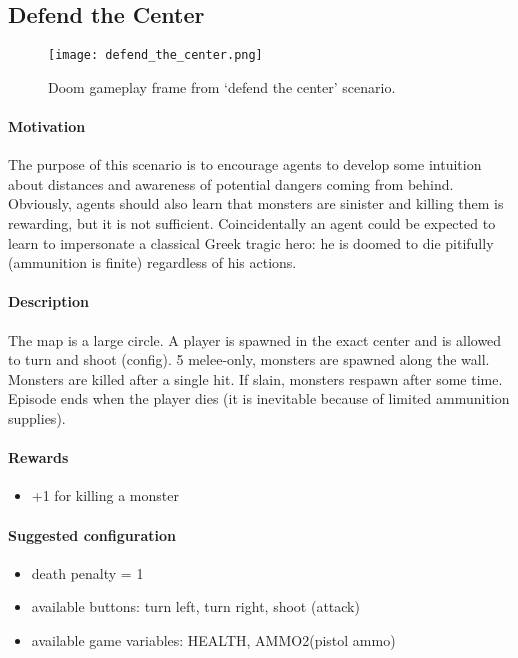 	\subsection{Defend the Center}\label{subsec:defend_the_center}
		\begin{figure}
			\centering
			\texttt{[image: defend\_the\_center.png]}
			\caption{Doom gameplay frame from `defend the center' scenario.}\label{fig:defend_the_center}
		\end{figure}
		\paragraph{Motivation} 
			The purpose of this scenario is to encourage agents to develop some intuition about distances and awareness of potential dangers coming from behind. Obviously, agents should also learn that monsters are sinister and killing them is rewarding, but it is not sufficient. Coincidentally an agent could be expected to learn to impersonate a classical Greek tragic hero: he is doomed to die pitifully (ammunition is finite) regardless of his actions.

		\paragraph{Description}
			The map is a large circle. A player is spawned in the exact center and is allowed to turn and shoot (config). 5 melee-only, monsters are spawned along the wall. Monsters are killed after a single hit. If slain, monsters respawn after some time. Episode ends when the player dies (it is inevitable because of limited ammunition supplies).

		\paragraph{Rewards}
			\begin{itemize}
				\item +1 for killing a monster
			\end{itemize}
		
		\paragraph{Suggested configuration}
			\begin{itemize}
				\item death penalty = 1
				\item available buttons: turn left, turn right, shoot (attack)
				\item available game variables: HEALTH, AMMO2(pistol ammo)
			\end{itemize}
	\newpage

